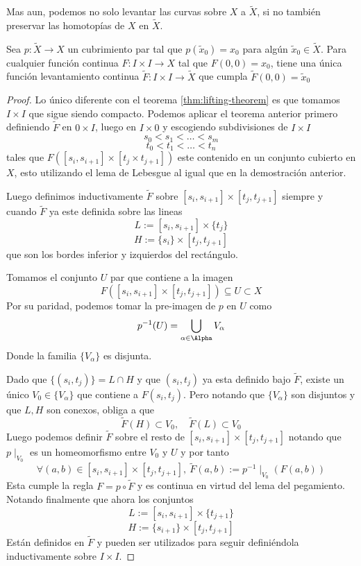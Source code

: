 Mas aun, podemos no solo levantar las curvas sobre \(X\) a \(\tilde X\),
si no también preservar las homotopías de \(X\) en \(\tilde X\).
\begin{corolario}
  Sea \(p : \tilde X \to X\) un cubrimiento par tal que \(p(\tilde x _0)
  = x_0 \) para algún \(\tilde x _0 \in \tilde X\). Para cualquier
  función continua \(F : I \times I \to X\) tal que \(F(0,0) = x_0\), tiene una
  única función levantamiento continua \(\tilde F : I \times I \to
  \tilde X\) que cumpla \(\tilde F (0,0) = \tilde x_0\)
\end{corolario}
\begin{proof}
  Lo único diferente con el teorema \ref{thm:lifting-theorem} es que
  tomamos \(I \times I\) que sigue siendo compacto. Podemos aplicar el
  teorema anterior primero definiendo \(\tilde F\) en \(0 \times I\),
  luego en \(I \times 0\) y escogiendo subdivisiones de \(I \times I\)
  \[ s_0 < s_1 < \dotsc < s_m \]
  \[ t_0 < t_1 < \dotsc < t_n \]
  tales que \(F ([s_i , s_{i+1}] \times [t_j \times t_{j+1}])\) este
  contenido en un conjunto cubierto en \(X\), esto utilizando
  el lema de Lebesgue al igual que en la demostración anterior.

  Luego definimos inductivamente \(\tilde F\) sobre \([s_i, s_{i+1}]
  \times [t_j , t_{j+1}]\) siempre y cuando \(\tilde F\) ya este
  definida sobre las lineas
  \[ L := [s_i , s_{i+1}] \times \{t_j\}\]
  \[ H := \{s_i\} \times [t_j , t_{j+1}] \]
  que son los bordes inferior y izquierdos del rectángulo.

  Tomamos el conjunto \(U\) par que contiene a la imagen
  \[ F([s_i , s_{i+1}] \times [t_j , t_{j+1}]) \subseteq U \subset X \]
  Por su paridad, podemos tomar la pre-imagen de \(p\) en \(U\) como
  \[ p^{-1}(U) = \bigcup_{\alpha \in \Alpha} V_\alpha\]
  Donde la familia \(\{V_\alpha\}\) es disjunta.

  Dado que \( \{(s_i, t_j)\} = L \cap H\) y que \( (s_i , t_j) \) ya
  esta definido bajo \(\tilde F\), existe un único \(V_0 \in
  \{V_\alpha\}\) que contiene a \(F (s_i, t_j)\). Pero notando que
  \(\{V_\alpha\}\) son disjuntos y que \(L,H\) son conexos, obliga a que
  \[ \tilde F (H) \subset V_0, \quad \tilde F (L) \subset V_0 \]
  Luego podemos definir \(\tilde F\) sobre el resto de \([s_i,
    s_{i+1}] \times [t_j , t_{j+1}]\) notando que \(p \mid_{V_0}\) es
  un homeomorfismo entre \(V_0\) y \(U\) y por tanto
  \[ \forall (a,b) \in [s_i, s_{i+1}] \times [t_j , t_{j+1}],
    \ \tilde F (a,b) := p^{-1} \mid_{V_0} \left( F(a,b) \right) \]
  Esta cumple la regla \( F = p \circ \tilde F\) y es continua en virtud
  del lema del pegamiento. Notando finalmente que ahora los conjuntos
  \[ L := [s_i , s_{i+1}] \times \{t_{j+1}\}\]
  \[ H := \{s_{i+1}\} \times [t_j , t_{j+1}] \]
  Están definidos en \(\tilde F\) y pueden ser utilizados para seguir
  definiéndola inductivamente sobre \(I \times I\).
\end{proof}

